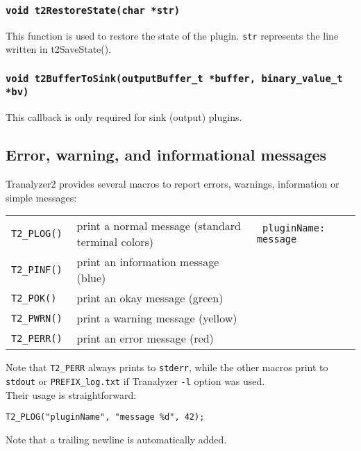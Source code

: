 \documentclass[documentation]{subfiles}
\begin{document}
\subsubsection{\tt void t2RestoreState(char *str)}\label{t2cb-t2RestoreState}
This function is used to restore the state of the plugin.
{\tt str} represents the line written in {t2SaveState()}.

\subsubsection{\tt void t2BufferToSink(outputBuffer\_t *buffer, binary\_value\_t *bv)}\label{t2cb-t2BufferToSink}
This callback is only required for sink (output) plugins.

\subsection{Error, warning, and informational messages}
Tranalyzer2 provides several macros to report errors, warnings, information or simple messages:
\begin{longtable}{>{\tt}ll>{\tt}l}
    \toprule
    T2\_PLOG() & print a normal message (standard terminal colors) & {\tt pluginName: message}\\
    T2\_PINF() & print an information message (blue)               & \color{blue}{[INF] pluginName: message}\\
    T2\_POK()  & print an okay message (green)                     & \color{green}{[OK] pluginName: message}\\
    T2\_PWRN() & print a warning message (yellow)                  & \color[rgb]{1,.75,0}{[WRN] pluginName: message}\\
    T2\_PERR() & print an error message (red)                      & \color{red}{[ERR] pluginName: message}\\
    \bottomrule
\end{longtable}

Note that {\tt T2\_PERR} always prints to {\tt stderr}, while the other macros print to {\tt stdout} or {\tt PREFIX\_log.txt} if Tranalyzer {\tt -l} option was used.\\

Their usage is straightforward:

\begin{center}
    {\tt T2\_PLOG("pluginName", "message \%d", 42);}
\end{center}

Note that a trailing newline is automatically added.
\end{document}
